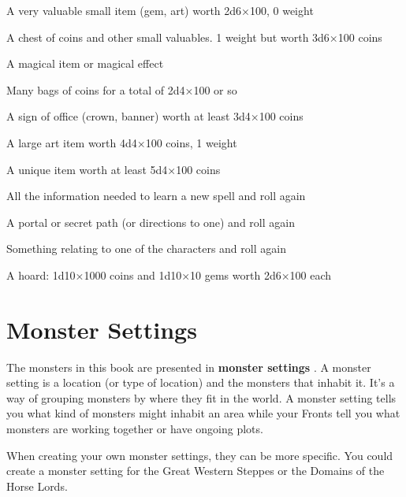  
\item A very valuable small item (gem, art) worth 2d6×100, 0 weight

 
\item A chest of coins and other small valuables. 1 weight but worth 3d6×100 coins

 
\item A magical item or magical effect

 
\item Many bags of coins for a total of 2d4×100 or so

 
\item A sign of office (crown, banner) worth at least 3d4×100 coins

 
\item A large art item worth 4d4×100 coins, 1 weight

 
\item A unique item worth at least 5d4×100 coins

 
\item All the information needed to learn a new spell and roll again

 
\item A portal or secret path (or directions to one) and roll again

 
\item Something relating to one of the characters and roll again

 
\item A hoard: 1d10×1000 coins and 1d10×10 gems worth 2d6×100 each


\stopitemize
 
\section{Monster Settings}    
 

The monsters in this book are presented in {\bf monster settings} . A monster setting is a location (or type of location) and the monsters that inhabit it. It's a way of grouping monsters by where they fit in the world. A monster setting tells you what kind of monsters might inhabit an area while your Fronts tell you what monsters are working together or have ongoing plots.

 

When creating your own monster settings, they can be more specific. You could create a monster setting for the Great Western Steppes or the Domains of the Horse Lords.

